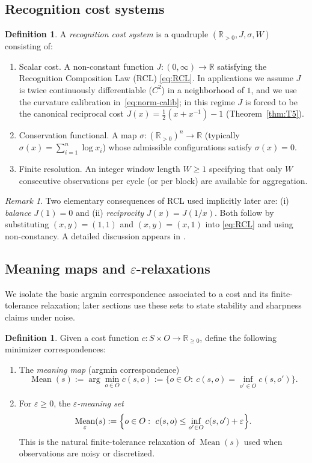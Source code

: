 \documentclass[11pt,reqno]{amsart}
\theoremstyle{plain}
\theoremstyle{definition}
\newtheorem{definition}[theorem]{Definition}
\theoremstyle{remark}
\newtheorem{remark}[theorem]{Remark} %
\newcommand{\Jcost}{J}
\newcommand{\RR}{\mathbb{R}}
\newcommand{\Rp}{\RR_{>0}}
\newcommand{\1}{\mathbf{1}}
\DeclareMathOperator{\Mean}{Mean}
\begin{document}
\subsection{Recognition cost systems}
\begin{definition}\label{def:rcs}
A \emph{recognition cost system} is a quadruple $(\Rp,\Jcost,\sigma,W)$ consisting of:
\begin{enumerate}[label=\textup{(C\arabic*)},leftmargin=2.2em]
\item Scalar cost. A non-constant function $\Jcost:(0,\infty)\to\RR$ satisfying the Recognition Composition Law
(RCL) \eqref{eq:RCL}. In applications we assume $\Jcost$ is twice continuously differentiable ($C^2$) in a neighborhood of $1$, and we use the curvature calibration in~\eqref{eq:norm-calib}; in this regime $\Jcost$ is forced to be the canonical reciprocal cost
$\Jcost(x)=\tfrac12(x+x^{-1})-1$ (Theorem~\ref{thm:T5}).
\item Conservation functional. A map $\sigma:(\Rp)^n\to\RR$ (typically $\sigma(x)=\sum_{i=1}^n \log x_i$)
whose admissible configurations satisfy $\sigma(x)=0$.
\item Finite resolution. An integer window length $W\ge 1$ specifying that only $W$ consecutive observations
per cycle (or per block) are available for aggregation.
\end{enumerate}
\end{definition}

\begin{remark}\label{rem:rcs-basic}
Two elementary consequences of RCL used implicitly later are:
(i) \emph{balance} $\Jcost(1)=0$ and (ii) \emph{reciprocity} $\Jcost(x)=\Jcost(1/x)$.
Both follow by substituting $(x,y)=(1,1)$ and $(x,y)=(x,1)$ into \eqref{eq:RCL} and using non-constancy.
A detailed discussion appears in \cite{aczel1966,aczel_dhombres1989}.
\end{remark}

\subsection{Meaning maps and \texorpdfstring{$\varepsilon$}{epsilon}-relaxations}
We isolate the basic argmin correspondence associated to a cost and its finite-tolerance relaxation; later sections use these sets to state stability and sharpness claims under noise.

\begin{definition}\label{def:meaning-map}
Given a cost function $c:S\times O\to\RR_{\ge 0}$, define the following minimizer correspondences:
\begin{enumerate}[nosep,label=\textup{(\roman*)}]
\item The \emph{meaning map} (argmin correspondence)
\[
\Mean(s):=\arg\min_{o\in O} c(s,o)
:=\{o\in O:\ c(s,o)=\inf_{o'\in O}c(s,o')\}.
\]
\item For $\varepsilon\ge 0$, the \emph{$\varepsilon$-meaning set}
\[
\Mean_{\varepsilon}(s):=\Bigl\{o\in O:\ c(s,o)\le \inf_{o'\in O}c(s,o')+\varepsilon\Bigr\}.
\]
This is the natural finite-tolerance relaxation of $\Mean(s)$ used when observations are noisy or discretized.
\end{enumerate}
\end{definition}
\end{document}
